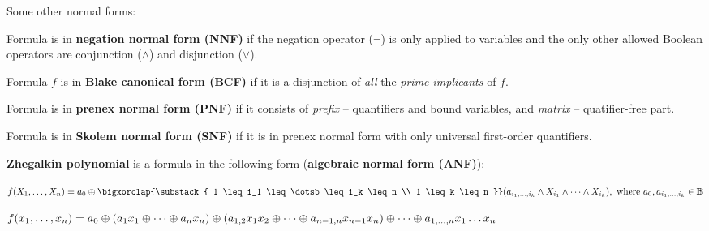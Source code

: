 \documentclass[a4paper,10pt]{article}
\begin{document}
\begin{terms}
    \item Some other normal forms:
    \begin{terms}
        \item Formula is in \textbf{negation normal form (NNF)} if the negation operator ($\neg$) is only applied to variables and the only other allowed Boolean operators are conjunction ($\land$) and disjunction ($\lor$).

        \item Formula $f$ is in \textbf{Blake canonical form (BCF)} if it is a disjunction of \emph{all} the \textit{prime implicants} of $f$.

        \item Formula is in \textbf{prenex normal form (PNF)} if it consists of \textit{prefix} \--- quantifiers and bound variables, and \textit{matrix} \--- quatifier-free part.

        \item Formula is in \textbf{Skolem normal form (SNF)} if it is in prenex normal form with only universal first-order quantifiers.

        \item \textbf{Zhegalkin polynomial} is a formula in the following form (\textbf{algebraic normal form (ANF)}):
        \begin{terms}
            \item \(
                f(X_1, \dotsc, X_n) = a_0 \xor
                \bigxorclap{\substack{
                    1 \leq i_1 \leq \dotsb \leq i_k \leq n \\
                    1 \leq k \leq n }}
                (a_{i_1, \dotsc, i_k} \land X_{i_1} \land \dots \land X_{i_k}),
                \text{ where } a_0, a_{i_1, \dotsc, i_k} \in \Bool
            \)

            \item \(
                f(x_1, \dotsc, x_n) = a_0 \oplus (a_1 x_1 \oplus \dotsb \oplus a_n x_n) \oplus (a_{1,2} x_1 x_2 \oplus \dotsb \oplus a_{n-1,n} x_{n-1} x_n) \oplus \dotsb \oplus a_{1,\dotsc,n} x_1 \dots x_n
            \)
        \end{terms}
    \end{terms}
\end{terms}
\end{document}
